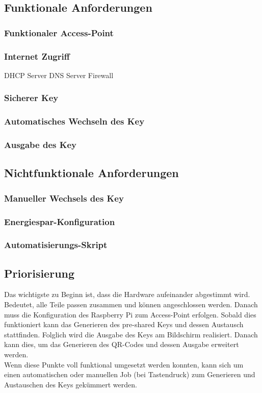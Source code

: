 \documentclass[a4paper,11pt,singlespacing]{article}
\begin{document}
			\subsection{Funktionale Anforderungen}
			
            \subsubsection{Funktionaler Access-Point}
            
                \subsubsection{Internet Zugriff}
                	 DHCP Server
    				 DNS Server
    				 Firewall
                \subsubsection{Sicherer Key}
    			\subsubsection{Automatisches Wechseln des Key}
    			\subsubsection{Ausgabe des Key}
		
			\subsection{Nichtfunktionale Anforderungen}
                \subsubsection{Manueller Wechsels des Key}
                \subsubsection{Energiespar-Konfiguration}
                \subsubsection{Automatisierungs-Skript}

    		\subsection{Priorisierung}
            	Das wichtigste zu Beginn ist, dass die Hardware aufeinander abgestimmt wird. Bedeutet, alle Teile passen zusammen und können angeschlossen werden.
            	Danach muss die Konfiguration des Raspberry Pi zum Access-Point erfolgen. Sobald dies funktioniert kann das Generieren des pre-shared Keys und dessen Austausch stattfinden. Folglich wird die Ausgabe des Keys am Bildschirm realisiert. Danach kann dies, um das Generieren des QR-Codes und dessen Ausgabe erweitert werden.\\
            	Wenn diese Punkte voll funktional umgesetzt werden konnten, kann sich um einen automatischen oder manuellen Job (bei Tastendruck) zum Generieren und Austauschen des Keys gekümmert werden.
    	
\end{document}

